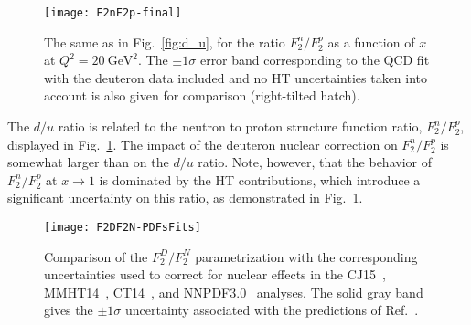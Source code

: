 \documentclass[%
      aps,
      prd,
      floatfix,
      preprintnumbers,
      preprint,
      showpacs,
      nofootinbib,
      tightenlines,
      amssymb,
      amsmath
]{revtex4-1}
\newcommand{\gevsq}  {\:\mathrm{GeV}^2}
\begin{document}
\begin{figure}[tb] %
\begin{center}
\texttt{[image: F2nF2p-final]}
\caption{%
The same as in Fig.~\ref{fig:d_u}, for the ratio $F_2^n/F_2^p$ as a function of $x$ at $Q^2=20\gevsq$. 
The $\pm 1 \sigma$ error band corresponding to the QCD fit with the deuteron data included and no 
HT uncertainties taken into account is also given for comparison (right-tilted hatch). 
}
\label{fig:n_p}
\end{center}
\end{figure}


The $d/u$ ratio is related to the neutron to proton structure function ratio,     
$F_2^n/F_2^p$, displayed in Fig.~\ref{fig:n_p}. 
The impact of the deuteron nuclear correction on $F_2^n/F_2^p$ is somewhat larger 
than on the $d/u$ ratio. Note, however, that the behavior of $F_2^n/F_2^p$ at $x \to 1$ is 
dominated by the HT contributions, which introduce a significant uncertainty on this ratio, 
as demonstrated in Fig.~\ref{fig:n_p}. 
 

\begin{figure}[tb] %
\begin{center}
\texttt{[image: F2DF2N-PDFsFits]}
\caption{%
Comparison of the $F_2^D/F_2^N$ parametrization with the corresponding uncertainties used to correct 
for nuclear effects in the  
CJ15~\cite{Accardi:2016qay}, MMHT14~\cite{Harland-Lang:2014zoa}, CT14~\cite{Dulat:2015mca}, 
and NNPDF3.0~\cite{Ball:2014uwa} analyses.  
The solid gray band gives the $\pm 1 \sigma$ uncertainty associated with the predictions of Ref.~\cite{KP04}.
}
\label{fig:f2d-PDFsFits}
\end{center}
\end{figure}
\end{document}
